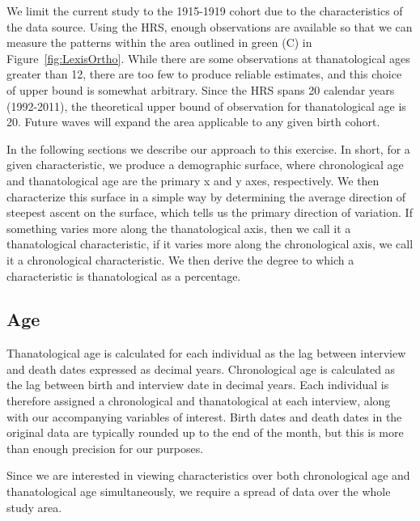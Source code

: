 \documentclass{article}
\begin{document}
We limit the current study to the 1915-1919 cohort due
to the characteristics of the data source. Using the HRS, enough
observations are available so that we can measure the patterns
within the area outlined in green (C) in Figure~\ref{fig:LexisOrtho}. While
there are some observations at thanatological ages greater than 12, there are too few
to produce reliable estimates, and this choice of upper bound is somewhat
arbitrary. Since the HRS spans 20 calendar years (1992-2011), the theoretical
upper bound of observation for thanatological age is 20. Future waves will
expand the area applicable to any given birth cohort.

In the following sections we describe our approach to this exercise.
In short, for a given characteristic, we produce a demographic surface, where
chronological age and thanatological age are the primary x and y axes, respectively.
We then characterize this surface in a simple way by determining the average direction of steepest ascent on the surface,
which tells us the primary direction of variation. If something varies more along the thanatological axis, then we call it a thanatological characteristic, if it varies more along the chronological axis, we call it a chronological characteristic. We then derive the degree to which a characteristic is thanatological as a percentage.

\subsection{Age}
Thanatological age is calculated for each individual as the lag between
interview and death dates expressed as decimal years. Chronological age is
calculated as the lag between birth and interview date in decimal years. Each
individual is therefore assigned a chronological and thanatological at each
interview, along with our accompanying variables of interest.
Birth dates and death dates in the original data are typically rounded up to the end
of the month, but this is more than enough precision for our purposes. 

Since we
are interested in viewing characteristics over both chronological age and
thanatological age simultaneously, we require a spread of data over
the whole study area. 


\end{document}
